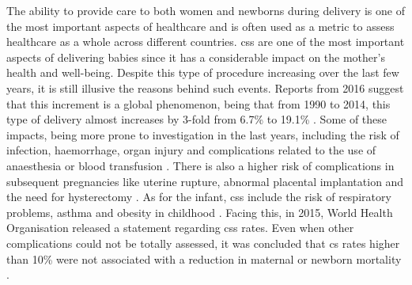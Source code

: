 The ability to provide care to both women and newborns during delivery is one of the most important aspects of healthcare and is often used as a metric to assess healthcare as a whole across different countries.
\acp{cs} are one of the most important aspects of delivering babies since it has a considerable impact on the mother's health and well-being. Despite this type of procedure increasing over the last few years, it is still illusive the reasons behind such events. Reports from 2016 suggest that this increment is a global phenomenon, being that from 1990 to 2014, this type of delivery almost increases by 3-fold from 6.7\% to 19.1\% \cite{betranIncreasingTrendCaesarean2016,chenNonClinicalInterventions2018}. Some of these impacts, being more prone to investigation in the last years, including the risk of infection, haemorrhage, organ injury and complications related to the use of anaesthesia or blood transfusion \cite{caesereanrisk1,caesereanrisk2}.
There is also a higher risk of complications in subsequent pregnancies like uterine rupture, abnormal placental implantation and the need for hysterectomy \cite{caesereanrisk3,caesereanrisk4}. As for the infant, \acp{cs} include the risk of respiratory problems, asthma and obesity in childhood \cite{caesereanrisk3}.
Facing this, in 2015, World Health Organisation released a statement regarding \acp{cs} rates. Even when other complications could not be totally assessed, it was concluded that \ac{cs} rates higher than 10\% were not associated with a reduction in maternal or newborn mortality \cite{worldhealthorganizationhumanreproductionprogramme10april2015WHOStatementCaesarean2015}.

